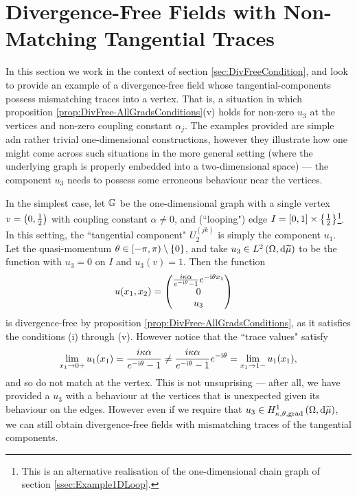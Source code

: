 \section{Divergence-Free Fields with Non-Matching Tangential Traces} \label{sec:CC-DivFree-ExampleFunctions}
In this section we work in the context of section \ref{sec:DivFreeCondition}, and look to provide an example of a divergence-free field whose tangential-components possess mismatching traces into a vertex.
That is, a situation in which proposition \ref{prop:DivFree-AllGradsConditions}(v) holds for non-zero $u_3$ at the vertices and non-zero coupling constant $\alpha_j$.
The examples provided are simple adn rather trivial one-dimensional constructions, however they illustrate how one might come across such situations in the more general setting (where the underlying graph is properly embedded into a two-dimensional space) --- the component $u_3$ needs to possess some erroneous behaviour near the vertices.

In the simplest case, let $\mathbb{G}$ be the one-dimensional graph with a single vertex $v=\left( 0,\frac{1}{2} \right)$ with coupling constant $\alpha\neq 0$, and (``looping") edge $I = \left[ 0,1 \right]\times\left\{ \frac{1}{2} \right\}$\footnote{
This is an alternative realisation of the one-dimensional chain graph of section \ref{ssec:Example1DLoop}.}.
In this setting, the ``tangential component" $U_2^{(jk)}$ is simply the component $u_1$.
Let the quasi-momentum $\theta\in\left[-\pi,\pi\right)\setminus\left\{ 0 \right\}$, and take $u_3\in L^{2}\left( \Omega,\mathrm{d} \widetilde{\mu} \right)$ to be the function with $u_3=0$ on $I$ and $u_3(v)=1$.
Then the function
\begin{align*}
    u(x_1,x_2) &=
    \begin{pmatrix}
        \frac{i\kappa\alpha}{e^{-\mathrm{i}\theta}-1}e^{-\mathrm{i}\theta x_1} \\
        0 \\
        u_3
    \end{pmatrix}
\end{align*}
is divergence-free by proposition \ref{prop:DivFree-AllGradsConditions}, as it satisfies the conditions (i) through (v).
However notice that the ``trace values" satisfy
\begin{align*}
    \lim_{x_1\rightarrow0+}u_1(x_1) = \frac{i\kappa\alpha}{e^{-\mathrm{i}\theta}-1}
    \neq \frac{i\kappa\alpha}{e^{-\mathrm{i}\theta}-1}e^{-\mathrm{i}\theta}
    = \lim_{x_1\rightarrow1-}u_1(x_1),
\end{align*}
and so do not match at the vertex.
This is not unsuprising --- after all, we have provided a $u_3$ with a behaviour at the vertices that is unexpected given its behaviour on the edges.
However even if we require that $u_3\in H^1_{\kappa,\theta,\mathrm{grad}}\left( \Omega, \mathrm{d}\widetilde{\mu} \right)$, we can still obtain divergence-free fields with mismatching traces of the tangential components.

